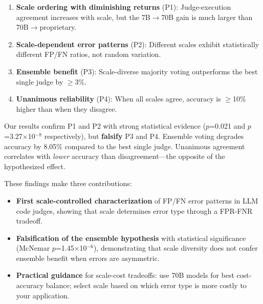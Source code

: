 \begin{enumerate}
    \item \textbf{Scale ordering with diminishing returns} (P1): Judge-execution agreement increases with scale, but the 7B$\rightarrow$70B gain is much larger than 70B$\rightarrow$proprietary.
    \item \textbf{Scale-dependent error patterns} (P2): Different scales exhibit statistically different FP/FN ratios, not random variation.
    \item \textbf{Ensemble benefit} (P3): Scale-diverse majority voting outperforms the best single judge by $\geq$3\%.
    \item \textbf{Unanimous reliability} (P4): When all scales agree, accuracy is $\geq$10\% higher than when they disagree.
\end{enumerate}

Our results confirm P1 and P2 with strong statistical evidence ($p$=0.021 and $p$=3.27$\times$10$^{-8}$ respectively), but \textbf{falsify} P3 and P4. Ensemble voting degrades accuracy by 8.05\% compared to the best single judge. Unanimous agreement correlates with \textit{lower} accuracy than disagreement---the opposite of the hypothesized effect.

These findings make three contributions:

\begin{itemize}
    \item \textbf{First scale-controlled characterization} of FP/FN error patterns in LLM code judges, showing that scale determines error type through a FPR-FNR tradeoff.
    \item \textbf{Falsification of the ensemble hypothesis} with statistical significance (McNemar $p$=1.45$\times$10$^{-6}$), demonstrating that scale diversity does not confer ensemble benefit when errors are asymmetric.
    \item \textbf{Practical guidance} for scale-cost tradeoffs: use 70B models for best cost-accuracy balance; select scale based on which error type is more costly to your application.
\end{itemize}
